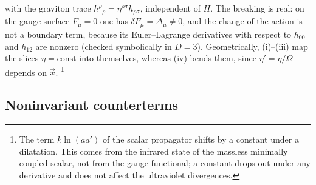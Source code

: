 \documentclass[aps,prd,onecolumn,10pt,nofootinbib,floatfix]{revtex4-2}
\begin{document}
with the graviton trace $h^\rho{}_\rho=\eta^{\rho\sigma}h_{\rho\sigma}$, independent of $H$.
The breaking is real: on the gauge surface $F_\mu=0$ one has $\delta F_\mu=\Delta_\mu\neq0$, and the change of the action is not a boundary term, because its Euler--Lagrange derivatives with respect to $h_{00}$ and $h_{12}$ are nonzero (checked symbolically in $D=3$).
Geometrically, (i)--(iii) map the slices $\eta=\text{const}$ into themselves, whereas (iv) bends them, since $\eta'=\eta/\Omega$ depends on $\vec x$.%
\footnote{The term $k\ln(aa')$ of the scalar propagator shifts by a constant under a dilatation. This comes from the infrared state of the massless minimally coupled scalar, not from the gauge functional; a constant drops out under any derivative and does not affect the ultraviolet divergences.}

\subsection{Noninvariant counterterms}
\label{sec:s5:noninv}
\end{document}
